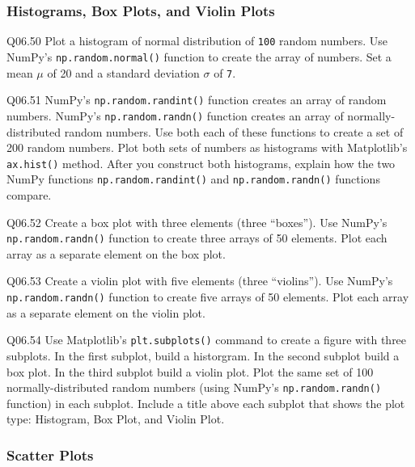 \documentclass{book}
\newcommand{\passthrough}[1]{#1}
\begin{document}
    




    
        \hypertarget{histograms-box-plots-and-violin-plots}{%
\subsubsection{Histograms, Box Plots, and Violin
Plots}\label{histograms-box-plots-and-violin-plots}}

Q06.50 Plot a histogram of normal distribution of
\passthrough{\lstinline!100!} random numbers. Use NumPy's
\passthrough{\lstinline!np.random.normal()!} function to create the
array of numbers. Set a mean \(\mu\) of 20 and a standard deviation
\(\sigma\) of \passthrough{\lstinline!7!}.

Q06.51 NumPy's \passthrough{\lstinline!np.random.randint()!} function
creates an array of random numbers. NumPy's
\passthrough{\lstinline!np.random.randn()!} function creates an array of
normally-distributed random numbers. Use both each of these functions to
create a set of 200 random numbers. Plot both sets of numbers as
histograms with Matplotlib's \passthrough{\lstinline!ax.hist()!} method.
After you construct both histograms, explain how the two NumPy functions
\passthrough{\lstinline!np.random.randint()!} and
\passthrough{\lstinline!np.random.randn()!} functions compare.

Q06.52 Create a box plot with three elements (three ``boxes''). Use
NumPy's \passthrough{\lstinline!np.random.randn()!} function to create
three arrays of 50 elements. Plot each array as a separate element on
the box plot.

Q06.53 Create a violin plot with five elements (three ``violins''). Use
NumPy's \passthrough{\lstinline!np.random.randn()!} function to create
five arrays of 50 elements. Plot each array as a separate element on the
violin plot.

Q06.54 Use Matplotlib's \passthrough{\lstinline!plt.subplots()!} command
to create a figure with three subplots. In the first subplot, build a
historgram. In the second subplot build a box plot. In the third subplot
build a violin plot. Plot the same set of 100 normally-distributed
random numbers (using NumPy's
\passthrough{\lstinline!np.random.randn()!} function) in each subplot.
Include a title above each subplot that shows the plot type: Histogram,
Box Plot, and Violin Plot.
    




    
        \hypertarget{scatter-plots}{%
\subsubsection{Scatter Plots}\label{scatter-plots}}
\end{document}
